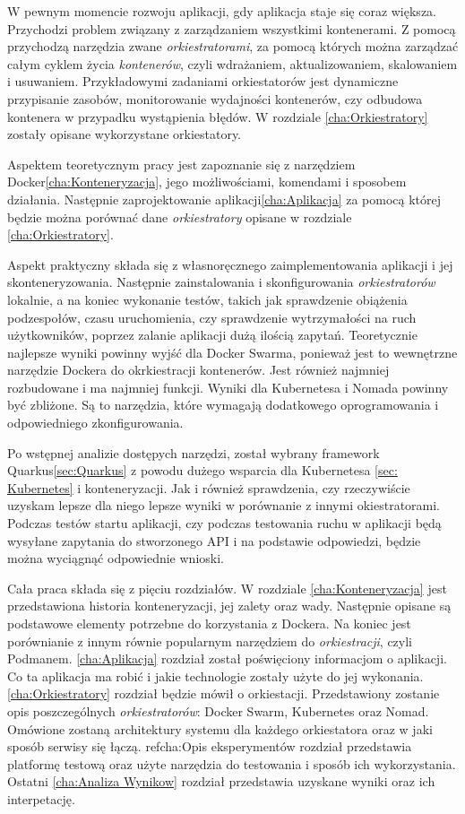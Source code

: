 \documentclass{iiuwb}
\begin{document}
W pewnym momencie rozwoju aplikacji, gdy aplikacja staje się coraz większa. Przychodzi problem związany z zarządzaniem wszystkimi kontenerami. Z pomocą przychodzą narzędzia zwane \textit{orkiestratorami}, za pomocą których można zarządzać całym cyklem życia \textit{kontenerów}, czyli wdrażaniem, aktualizowaniem, skalowaniem i usuwaniem. Przykładowymi zadaniami orkiestatorów jest dynamiczne przypisanie zasobów, monitorowanie wydajności kontenerów, czy odbudowa kontenera w przypadku wystąpienia błędów. W rozdziale \ref{cha:Orkiestratory} zostały opisane wykorzystane orkiestatory.

Aspektem teoretycznym pracy jest zapoznanie się z narzędziem Docker\ref{cha:Konteneryzacja}, jego możliwościami, komendami i sposobem działania. Następnie zaprojektowanie aplikacji\ref{cha:Aplikacja} za pomocą której będzie można porównać dane \textit{orkiestratory} opisane w rozdziale \ref{cha:Orkiestratory}.

Aspekt praktyczny składa się z własnoręcznego zaimplementowania aplikacji i jej skonteneryzowania. Następnie zainstalowania i skonfigurowania \textit{orkiestratorów} lokalnie, a na koniec wykonanie testów, takich jak sprawdzenie obiążenia podzespołów, czasu uruchomienia, czy sprawdzenie wytrzymałości na ruch użytkowników, poprzez zalanie aplikacji dużą ilością zapytań. Teoretycznie najlepsze wyniki powinny wyjść dla Docker Swarma, ponieważ jest to wewnętrzne narzędzie Dockera do okrkiestracji kontenerów. Jest również najmniej rozbudowane i ma najmniej funkcji. Wyniki dla Kubernetesa i Nomada powinny być zbliżone. Są to narzędzia, które wymagają dodatkowego oprogramowania i odpowiedniego zkonfigurowania.

Po wstępnej analizie dostępych narzędzi, został wybrany framework Quarkus\ref{sec:Quarkus} z powodu dużego wsparcia dla Kubernetesa \ref{sec: Kubernetes} i konteneryzacji. Jak i również sprawdzenia, czy rzeczywiście uzyskam lepsze dla niego lepsze wyniki w porównanie z innymi okiestratorami. Podczas testów startu aplikacji, czy podczas testowania ruchu w aplikacji będą wysyłane zapytania do stworzonego API i na podstawie odpowiedzi, będzie można wyciągnąć odpowiednie wnioski.
\newline

Cała praca składa się z pięciu rozdziałów. W rozdziale \ref{cha:Konteneryzacja} jest przedstawiona 
historia konteneryzacji, jej zalety oraz wady. Następnie opisane są podstawowe elementy potrzebne do 
korzystania z Dockera. Na koniec jest porównianie z innym równie popularnym narzędziem do 
\textit{orkiestracji}, czyli Podmanem. \ref{cha:Aplikacja} rozdział został poświęciony informacjom o aplikacji. 
Co ta aplikacja ma robić i jakie technologie zostały użyte do jej wykonania. \ref{cha:Orkiestratory} rozdział 
będzie mówił o orkiestacji. Przedstawiony zostanie opis poszczególnych \textit{orkiestratorów}: Docker Swarm, 
Kubernetes oraz Nomad. Omówione zostaną architektury systemu dla każdego orkiestatora oraz w jaki sposób 
serwisy się łączą. ref{cha:Opis eksperymentów} rozdział przedstawia platformę testową oraz użyte narzędzia 
do testowania i sposób ich wykorzystania. Ostatni \ref{cha:Analiza Wynikow} rozdział przedstawia uzyskane 
wyniki oraz ich interpetację.
\end{document}
